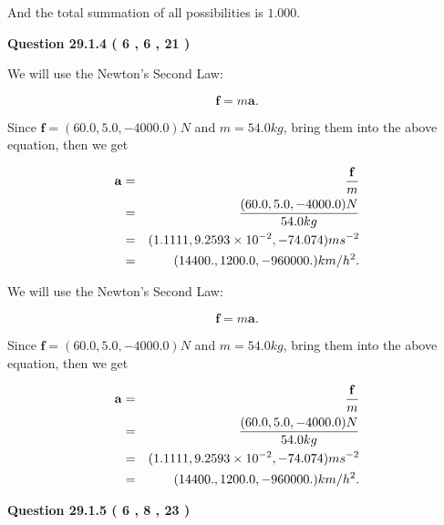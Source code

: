 \documentclass[12pt]{article}
\begin{document}
\noindent
 And the total summation of all possibilities is $  %
1.000 $.
 
 
 
  
\vspace{0.2in}
  
{\textbf{\Large{Question
29.1.4 
 (           6 ,           6 ,          21 )
}}}
  
  
 
 
\noindent{}

We will use the Newton's Second Law:
 
\[
\mathbf{f}=m\mathbf{a}.
\]
 
Since $\mathbf{f}=( %
60.0,  %
5.0,  %
-4000.0 )N$
and $m= %
54.0 kg$, bring them into the above equation, then we get
 
\begin{eqnarray*}
\mathbf{a}&=&\frac{\mathbf{f}}m  \\
&=&\frac{(
60.0 ,
5.0 ,
-4000.0 )N
}{ %
54.0 kg}  \\
&=&(
1.1111 ,
9.2593 \times 10^{-2},
-74.074
)ms^{-2} \\
&=&(
14400. ,
1200.0 ,
-960000.
)km/h^2.
\end{eqnarray*}
 
 
 
 
 
\noindent{}

We will use the Newton's Second Law:
 
\[
\mathbf{f}=m\mathbf{a}.
\]
 
Since $\mathbf{f}=( %
60.0,  %
5.0,  %
-4000.0 )N$
and $m= %
54.0 kg$, bring them into the above equation, then we get
 
\begin{eqnarray*}
\mathbf{a}&=&\frac{\mathbf{f}}m  \\
&=&\frac{(
60.0 ,
5.0 ,
-4000.0 )N
}{ %
54.0 kg}  \\
&=&(
1.1111 ,
9.2593 \times 10^{-2},
-74.074
)ms^{-2} \\
&=&(
14400. ,
1200.0 ,
-960000.
)km/h^2.
\end{eqnarray*}
 
 
 
  
\vspace{0.2in}
  
{\textbf{\Large{Question
29.1.5 
 (           6 ,           8 ,          23 )
}}}
  
\end{document}
